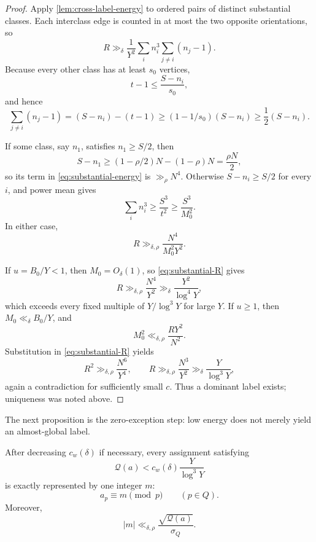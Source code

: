 \begin{proof}
Apply \cref{lem:cross-label-energy} to ordered pairs of distinct substantial classes.  Each interclass edge is counted in at most the two opposite orientations, so
\begin{equation}
\label{eq:substantial-energy}
 R\gg_\delta\frac1{Y^2}
 \sum_i n_i^3\sum_{j\neq i}(n_j-1).
\end{equation}
Because every other class has at least $s_0$ vertices,
\[
 t-1\leq\frac{S-n_i}{s_0},
\]
and hence
\[
 \sum_{j\neq i}(n_j-1)
 =(S-n_i)-(t-1)
 \geq(1-1/s_0)(S-n_i)
 \geq\frac12(S-n_i).
\]

If some class, say $n_1$, satisfies $n_1\geq S/2$, then
\[
 S-n_1\geq(1-\rho/2)N-(1-\rho)N=\frac{\rho N}{2},
\]
so its term in \cref{eq:substantial-energy} is $\gg_\rho N^4$.  Otherwise $S-n_i\geq S/2$ for every $i$, and power mean gives
\[
 \sum_i n_i^3\geq\frac{S^3}{t^2}\geq\frac{S^3}{M_0^2}.
\]
In either case,
\begin{equation}
\label{eq:substantial-R}
 R\gg_{\delta,\rho}\frac{N^4}{M_0^2Y^2}.
\end{equation}

If $u=B_0/Y<1$, then $M_0=O_\delta(1)$, so \cref{eq:substantial-R} gives
\[
 R\gg_{\delta,\rho}\frac{N^4}{Y^2}
 \gg_\delta\frac{Y^2}{\log^4Y},
\]
which exceeds every fixed multiple of $Y/\log^3Y$ for large $Y$.  If $u\geq1$, then $M_0\ll_\delta B_0/Y$, and
\[
 M_0^2\ll_{\delta,\rho}\frac{RY^2}{N^2}.
\]
Substitution in \cref{eq:substantial-R} yields
\[
 R^2\gg_{\delta,\rho}\frac{N^6}{Y^4},
 \qquad
 R\gg_{\delta,\rho}\frac{N^3}{Y^2}
 \gg_\delta\frac{Y}{\log^3Y},
\]
again a contradiction for sufficiently small $c$.  Thus a dominant label exists; uniqueness was noted above.
\end{proof}

The next proposition is the zero-exception step: low energy does not merely yield an almost-global label.

\begin{proposition}
\label{prop:exact-cold-rigidity}
After decreasing $c_w(\delta)$ if necessary, every assignment satisfying
\[
 \mathcal Q(a)<c_w(\delta)\frac{Y}{\log^3Y}
\]
is exactly represented by one integer $m$:
\[
 a_p\equiv m\pmod p
 \qquad(p\in Q).
\]
Moreover,
\[
 |m|\ll_{\delta,\rho}\frac{\sqrt{\mathcal Q(a)}}{\sigma_Q}.
\]
\end{proposition}

